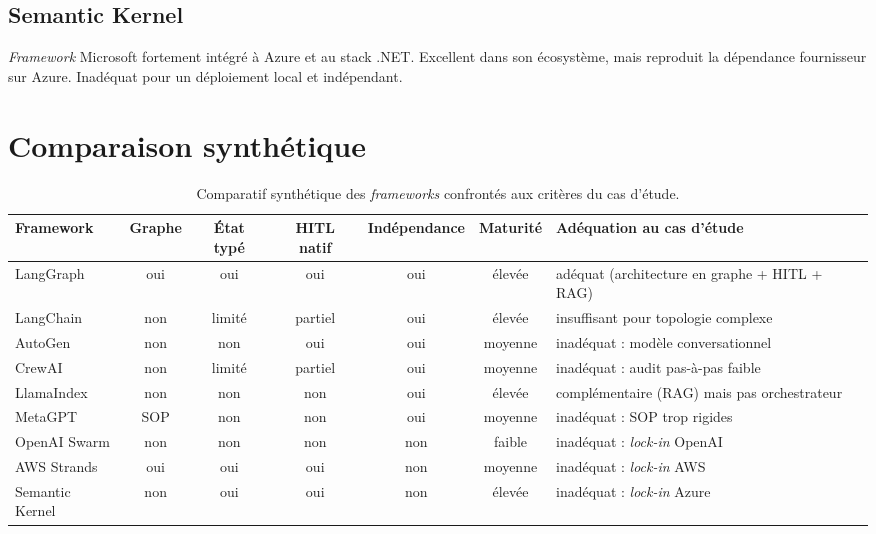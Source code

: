 \subsection{Semantic Kernel}

\emph{Framework} Microsoft fortement intégré à Azure et au stack .NET. Excellent dans son écosystème, mais reproduit la dépendance fournisseur sur Azure. Inadéquat pour un déploiement local et indépendant.

\section{Comparaison synthétique}

\begin{table}[H]
\centering
\footnotesize
\setlength{\tabcolsep}{4pt}
\begin{tabularx}{\textwidth}{@{}lcccccX@{}}
\toprule
\textbf{Framework} & \textbf{Graphe} & \textbf{État typé} & \textbf{HITL natif} & \textbf{Indépendance} & \textbf{Maturité} & \textbf{Adéquation au cas d'étude} \\
\midrule
LangGraph         & oui & oui & oui            & oui & élevée   & adéquat (architecture en graphe + HITL + RAG) \\
LangChain         & non & limité & partiel    & oui & élevée   & insuffisant pour topologie complexe \\
AutoGen           & non & non & oui            & oui & moyenne  & inadéquat : modèle conversationnel \\
CrewAI            & non & limité & partiel    & oui & moyenne  & inadéquat : audit pas-à-pas faible \\
LlamaIndex        & non & non & non            & oui & élevée   & complémentaire (RAG) mais pas orchestrateur \\
MetaGPT           & SOP & non & non            & oui & moyenne  & inadéquat : SOP trop rigides \\
OpenAI Swarm      & non & non & non            & non & faible   & inadéquat : \emph{lock-in} OpenAI \\
AWS Strands       & oui & oui & oui            & non & moyenne  & inadéquat : \emph{lock-in} AWS \\
Semantic Kernel   & non & oui & oui            & non & élevée   & inadéquat : \emph{lock-in} Azure \\
\bottomrule
\end{tabularx}
\caption{Comparatif synthétique des \emph{frameworks} confrontés aux critères du cas d'étude.}
\end{table}

